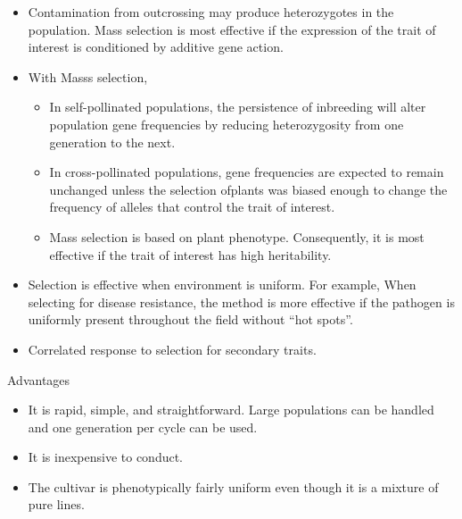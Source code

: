 \documentclass[11pt,ignorenonframetext,aspectratio=169]{beamer}
\providecommand{\tightlist}{%
  \setlength{\itemsep}{0pt}\setlength{\parskip}{0pt}}
\begin{document}
\begin{frame}{}
\protect\hypertarget{section-4}{}
\begin{itemize}
\tightlist
\item
  Contamination from outcrossing may produce heterozygotes in the
  population. Mass selection is most effective if the expression of the
  trait of interest is conditioned by additive gene action.
\item
  With Masss selection,

  \begin{itemize}
  \tightlist
  \item
    In self-pollinated populations, the persistence of inbreeding will
    alter population gene frequencies by reducing heterozygosity from
    one generation to the next.
  \item
    In cross-pollinated populations, gene frequencies are expected to
    remain unchanged unless the selection ofplants was biased enough to
    change the frequency of alleles that control the trait of interest.
  \item
    Mass selection is based on plant phenotype. Consequently, it is most
    effective if the trait of interest has high heritability.
  \end{itemize}
\item
  Selection is effective when environment is uniform. For example, When
  selecting for disease resistance, the method is more effective if the
  pathogen is uniformly present throughout the field without ``hot
  spots''.
\item
  Correlated response to selection for secondary traits.
\end{itemize}
\end{frame}

\begin{frame}{Advantages}
\protect\hypertarget{advantages}{}
\begin{itemize}
\tightlist
\item
  It is rapid, simple, and straightforward. Large populations can be
  handled and one generation per cycle can be used.
\item
  It is inexpensive to conduct.
\item
  The cultivar is phenotypically fairly uniform even though it is a
  mixture of pure lines.
\end{itemize}
\end{frame}
\end{document}
